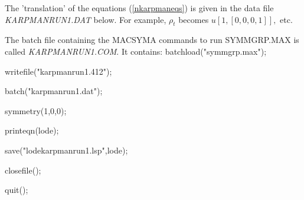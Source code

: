 {\nopagebreak
The 'translation' of the equations (\ref{nkarpmaneqs}) 
is given in the data file {\it KARPMANRUN1.DAT} below. 
For example, $ \rho_{t}$ becomes $u[1,[0,0,0,1]],$ etc.

\nopagebreak
The batch file containing the MACSYMA commands to run 
SYMMGRP.MAX is called {\em KARPMANRUN1.COM}. It contains:
\vskip 1pt
batchload("symmgrp.max"); \par
writefile("karpmanrun1.412"); \par
batch("karpmanrun1.dat"); \par
symmetry(1,0,0); \par
printeqn(lode); \par
save("lodekarpmanrun1.lsp",lode); \par
closefile(); \par
quit(); \par

}

